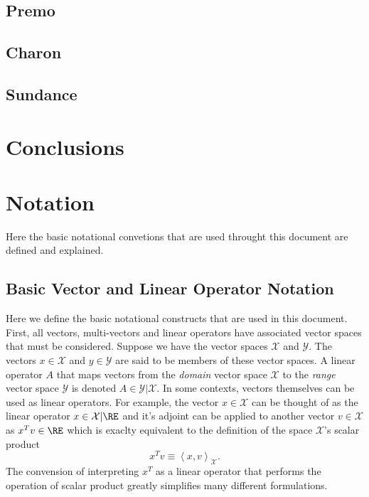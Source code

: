 \documentclass[pdf,ps2pdf,11pt]{SANDreport}
\begin{document}
\subsection{Premo}

\subsection{Charon}

\subsection{Sundance}

\section{Conclusions}

%
\clearpage



%
\appendix

\section{Notation}

Here the basic notational convetions that are used throught this
document are defined and explained.

\subsection{Basic Vector and Linear Operator Notation}

Here we define the basic notational constructs that are used in this document.
First, all vectors, multi-vectors and linear operators have associated vector
spaces that must be considered.  Suppose we have the vector spaces
$\mathcal{X}$ and $\mathcal{Y}$.  The vectors $x\in\mathcal{X}$ and
$y\in\mathcal{Y}$ are said to be members of these vector spaces.  A linear
operator $A$ that maps vectors from the {}\textit{domain} vector space
$\mathcal{X}$ to the {}\textit{range} vector space $\mathcal{Y}$ is denoted
$A\in\mathcal{Y}|\mathcal{X}$.  In some contexts, vectors themselves can be
used as linear operators.  For example, the vector $x\in\mathcal{X}$ can be
thought of as the linear operator $x\in\mathcal{X}|\RE$ and it's adjoint can
be applied to another vector $v\in\mathcal{X}$ as $x^T v {}\in\RE$ which is
exaclty equivalent to the definition of the space $\mathcal{X}$'s scalar
product
%
\[
x^T v \equiv \left< x, v \right>_{\mathcal{X}}.
\]
%
The convension of interpreting $x^T$ as a linear operator that performs the
operation of scalar product greatly simplifies many different formulations.
\end{document}
